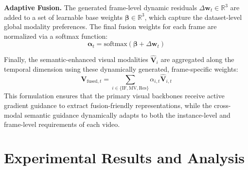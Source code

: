 \documentclass[letterpaper]{article} %
\begin{document}
\noindent\textbf{Adaptive Fusion.} 
The generated frame-level dynamic residuals $\Delta \mathbf{w}_t \in \mathbb{R}^3$ are added to a set of learnable base weights $\boldsymbol{\beta} \in \mathbb{R}^3$, which capture the dataset-level global modality preferences. The final fusion weights for each frame are normalized via a softmax function:
$$\boldsymbol{\alpha}_t = \text{softmax}(\boldsymbol{\beta} + \Delta \mathbf{w}_t)$$



Finally, the semantic-enhanced visual modalities $\hat{\mathbf{V}}_i$ are aggregated along the temporal dimension using these dynamically generated, frame-specific weights:
$$\mathbf{V}_{\text{fused}, t} = \sum_{i \in \{\text{IF}, \text{MV}, \text{Res}\}} \alpha_{i, t} \hat{\mathbf{V}}_{i, t}$$
This formulation ensures that the primary visual backbones receive active gradient guidance to extract fusion-friendly representations, while the cross-modal semantic guidance dynamically adapts to both the instance-level and frame-level requirements of each video.



\section{Experimental Results and Analysis}
\label{sec:experiments} %
\end{document}
